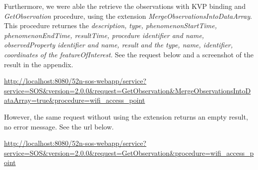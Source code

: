 Furthermore, we were able the retrieve the observations with KVP binding and
\textit{GetObservation} procedure, using the extension
\textit{MergeObservationsIntoDataArray}. This procedure returnes the
\textit{description, type, phenomenonStartTime, phenomenonEndTime, 
resultTime, procedure identifier and name, observedProperty identifier and 
name, result and the type, name, identifier, coordinates of the 
featureOfInterest}. See the request below and a screenshot of the result in the 
appendix.

\url{http://localhost:8080/52n-sos-webapp/service?service=SOS&version=2.0.0&request=GetObservation&MergeObservationsIntoDataArray=true&procedure=wifi_access_point}

However, the same request without using the extension returns an empty result,
no error message. See the url below.

\url{http://localhost:8080/52n-sos-webapp/service?service=SOS&version=2.0.0&request=GetObservation&procedure=wifi_access_point}
